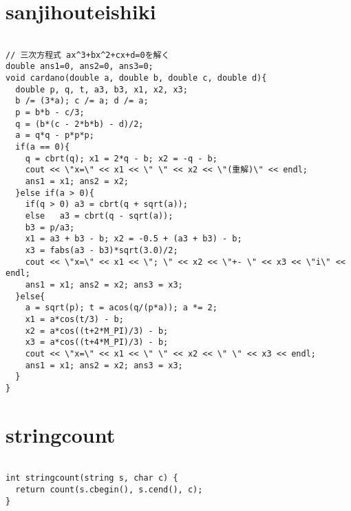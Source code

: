\documentclass[a4j,titlepage]{jarticle} %
\begin{document}
\color{white}
\section{sanjihouteishiki}
\color{black}
\begin{lstlisting}[caption=sanjihouteishiki]

// 三次方程式 ax^3+bx^2+cx+d=0を解く 
double ans1=0, ans2=0, ans3=0;
void cardano(double a, double b, double c, double d){
  double p, q, t, a3, b3, x1, x2, x3;
  b /= (3*a); c /= a; d /= a;
  p = b*b - c/3;
  q = (b*(c - 2*b*b) - d)/2;
  a = q*q - p*p*p;
  if(a == 0){
    q = cbrt(q); x1 = 2*q - b; x2 = -q - b;
    cout << \"x=\" << x1 << \" \" << x2 << \"(重解)\" << endl;
    ans1 = x1; ans2 = x2;
  }else if(a > 0){
    if(q > 0) a3 = cbrt(q + sqrt(a));
    else   a3 = cbrt(q - sqrt(a));
    b3 = p/a3;
    x1 = a3 + b3 - b; x2 = -0.5 + (a3 + b3) - b;
    x3 = fabs(a3 - b3)*sqrt(3.0)/2;
    cout << \"x=\" << x1 << \"; \" << x2 << \"+- \" << x3 << \"i\" << endl;
    ans1 = x1; ans2 = x2; ans3 = x3;
  }else{
    a = sqrt(p); t = acos(q/(p*a)); a *= 2;
    x1 = a*cos(t/3) - b;
    x2 = a*cos((t+2*M_PI)/3) - b;
    x3 = a*cos((t+4*M_PI)/3) - b;
    cout << \"x=\" << x1 << \" \" << x2 << \" \" << x3 << endl;
    ans1 = x1; ans2 = x2; ans3 = x3;
  }
}

\end{lstlisting}

\color{white}
\section{stringcount}
\color{black}
\begin{lstlisting}[caption=stringcount]

int stringcount(string s, char c) {
  return count(s.cbegin(), s.cend(), c);
}

\end{lstlisting}

\color{white}
\end{document}
